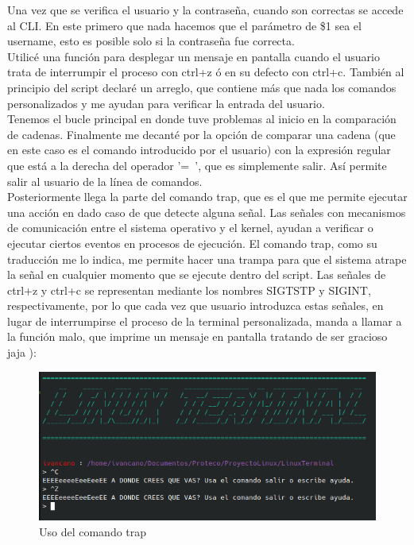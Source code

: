 \documentclass[letter,11pt]{article}
\begin{document}
Una vez que se verifica el usuario y la contraseña, cuando son correctas se accede al CLI. En este primero que nada hacemos que el parámetro de \$1 sea el username, esto es posible solo si la contraseña fue correcta. \\
Utilicé una función para desplegar un mensaje en pantalla cuando el usuario trata de interrumpir el proceso con ctrl+z ó en su defecto con ctrl+c. También al principio del script declaré un arreglo, que contiene más que nada los comandos personalizados y me ayudan para verificar la entrada del usuario.\\

Tenemos el bucle principal en donde tuve problemas al inicio en la comparación de cadenas. Finalmente me decanté por la opción de comparar una cadena (que en este caso es el comando introducido por el usuario) con la expresión regular que está a la derecha del operador '=~', que es simplemente salir. Así permite salir al usuario de la línea de comandos.\\

Posteriormente llega la parte del comando trap, que es el que me permite ejecutar una acción en dado caso de que detecte alguna señal. Las señales con mecanismos de comunicación entre el sistema operativo y el kernel, ayudan a verificar o ejecutar ciertos eventos en procesos de ejecución. El comando trap, como su traducción me lo indica, me permite hacer una trampa para que el sistema atrape la señal en cualquier momento que se ejecute dentro del script. Las señales de ctrl+z y ctrl+c se representan mediante los nombres SIGTSTP y SIGINT, respectivamente, por lo que cada vez que usuario introduzca estas señales, en lugar de interrumpirse el proceso de la terminal personalizada, manda a llamar a la función malo, que imprime un mensaje en pantalla tratando de ser gracioso jaja ): \\

\begin{figure} 
    \centering 
    \caption{Uso del comando trap}
    \includegraphics[scale=.6]{trap.png} 
\end{figure}
\end{document}
